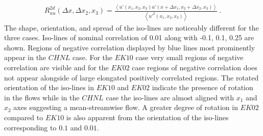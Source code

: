 \documentclass{amsart}
\begin{document}
\begin{align}
 R_{uu}^{2d}(\Delta x, \Delta x_2, x_3)=\frac{\left < u'(x_1, x_2, x_3)u'(x+ \Delta x_1, x_2 + \Delta x_2, x_3) \right >}{\left < u'^{2}(x_1,x_2,x_3)\right >} \ .
 \label{eqn:2d_corr}
\end{align}
The shape, orientation, and spread of the iso-lines are noticeably different for the three cases. Iso-lines of nominal correlation of 0.01 along with -0.1, 0.1, 0.25 are shown. Regions of negative correlation displayed by blue lines most prominently appear in  the $CHNL$ case. For the $EK10$ case very small regions of negative correlation are visible and for the $EK02$ case regions of negative correlation does not appear alongside of large elongated positively correlated regions. The rotated orientation of the iso-lines in $EK10$ and $EK02$ indicate  the presence of rotation in the flows while in the $CHNL$ case the iso-lines are almost aligned with $x_1$ and $x_2$ axes suggesting  a mean-streamwise flow. A greater degree of rotation in $EK02$ compared to $EK10$ is also apparent from the orientation of the iso-lines corresponding to $0.1$ and $0.01$.  
\graphicspath{{chap1Img/}}
\end{document}
